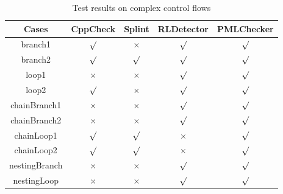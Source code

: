 \begin{table}[!h]
\center
\caption{Test results on complex control flows}\label{tab:7}
\begin{tabular}{|c|c|c|c|c|}
\hline
\textbf{Cases}  & \textbf{CppCheck} & \textbf{Splint} & \textbf{RLDetector} & \textbf{PMLChecker}\\
\hline
branch1	 &$\surd$ & $\times$ & $\surd$ & $\surd$\\
\hline
branch2    & $\surd$ & $\surd$ & $\surd$ & $\surd$\\
\hline
loop1	 &$\times$ &	$\times$ & $\surd$ & $\surd$\\
\hline
loop2    & $\surd$ &$\times$ & $\surd$ & $\surd$\\
\hline
chainBranch1 & $\times$ & $\times$ & $\surd$ & $\surd$\\
\hline
chainBranch2 &	$\times$	& $\times$ & $\surd$ & $\surd$\\
\hline
chainLoop1	 & $\surd$ & $\surd$ & $\times$ & $\surd$\\
\hline
chainLoop2	 & $\surd$& $\surd$ & $\times$ & $\surd$\\
\hline
nestingBranch	 & $\times$ & $\times$ & $\surd$ & $\surd$\\
\hline
nestingLoop& $\times$ & $\times$ & $\surd$ & $\surd$\\
\hline
\end{tabular}
\end{table}



